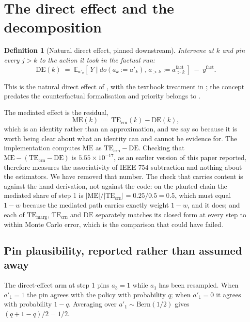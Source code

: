 \documentclass[11pt]{article}
\newtheorem{definition}{Definition}
\theoremstyle{remark}
\newcommand{\TEmarg}{\mathrm{TE}_{\mathrm{marg}}}
\newcommand{\TEcrn}{\mathrm{TE}_{\mathrm{crn}}}
\newcommand{\DE}{\mathrm{DE}}
\newcommand{\ME}{\mathrm{ME}}
\newcommand{\Ex}{\mathbb{E}}
\begin{document}
\section{The direct effect and the decomposition}
\label{sec:de}

\begin{definition}[Natural direct effect, pinned downstream]
Intervene at $k$ and pin every $j > k$ to the action it took in the factual run:
\[
  \DE(k) \;=\; \Ex_{a'_k}\!\left[\,Y \mid do(a_k := a'_k),\,
               a_{>k} := a^{\mathrm{fact}}_{>k}\,\right]
          \;-\; y^{\mathrm{fact}} .
\]
\end{definition}

This is the natural direct effect of \citet{pearl2001}, with the textbook
treatment in \citet[\S4.5.4--4.5.5]{pearl2009}; the concept predates the
counterfactual formalisation and priority belongs to \citet{robins1992}.

The mediated effect is the residual,
\begin{equation}
  \ME(k) \;=\; \TEcrn(k) - \DE(k),
  \label{eq:identity}
\end{equation}
which is an identity rather than an approximation, and we say so because it is
worth being clear about what an identity can and cannot be evidence for. The
implementation computes $\ME$ as $\TEcrn - \DE$. Checking that
$\ME - (\TEcrn - \DE)$ is $5.55 \times 10^{-17}$, as an earlier version of
this paper reported, therefore measures the associativity of IEEE 754
subtraction and nothing about the estimators. We have removed that number. The
check that carries content is against the hand derivation, not against the code:
on the planted chain the mediated share of step 1 is
$|\ME|/|\TEcrn| = 0.25/0.5 = 0.5$, which must equal $1-w$ because the mediated
path carries exactly weight $1-w$, and it does; and each of $\TEmarg$,
$\TEcrn$ and $\DE$ separately matches its closed form at every step to within
Monte Carlo error, which is the comparison that could have failed.

\subsection{Pin plausibility, reported rather than assumed away}

The direct-effect arm at step 1 pins $a_3 = 1$ while $a_1$ has been resampled.
When $a'_1 = 1$ the pin agrees with the policy with probability $q$; when
$a'_1 = 0$ it agrees with probability $1-q$. Averaging over
$a'_1 \sim \mathrm{Bern}(1/2)$ gives $(q + 1 - q)/2 = 1/2$.
\end{document}
